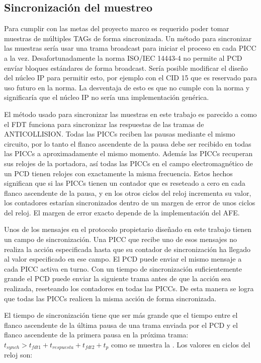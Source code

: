 \documentclass[a4paper, twoside, 11pt]{report}
\begin{document}
\FloatBarrier
\subsection{Sincronización del muestreo}

Para cumplir con las metas del proyecto marco es requerido poder tomar muestras de múltiples TAGs de forma sincronizada. Un método para sincronizar las muestras sería usar una trama broadcast para iniciar el proceso en cada PICC a la vez. Desafortunadamente la norma ISO/IEC 14443-4 no permite al PCD envíar bloques estándares de forma broadcast. Sería posible modificar el diseño del núcleo IP para permitir esto, por ejemplo con el CID 15 que es reservado para uso futuro en la norma. La desventaja de esto es que no cumple con la norma y significaría que el núcleo IP no sería una implementación genérica.

El método usado para sincronizar las muestras en este trabajo es parecido a como el FDT funciona para sincronizar las respuestas de las tramas de ANTICOLLISION. Todas las PICCs reciben las pausas mediante el mismo circuito, por lo tanto el flanco ascendente de la pausa debe ser recibido en todas las PICCs a aproximadamente el mismo momento. Además las PICCs recuperan sus relojes de la portadora, así todas las PICCs en el campo electromagnético de un PCD tienen relojes con exactamente la misma frecuencia. Estos hechos significan que si las PICCs tienen un contador que es reseteado a cero en cada flanco ascendente de la pausa, y en los otros ciclos del reloj incrementa su valor, los contadores estarían sincronizados dentro de un margen de error de unos ciclos del reloj. El margen de error exacto depende de la implementación del AFE.

Unos de los mensajes en el protocolo propietario diseñado en este trabajo tienen un campo de sincronización. Una PICC que recibe uno de esos mensajes no realiza la acción especificada hasta que su contador de sincronización ha llegado al valor especificado en ese campo. El PCD puede enviar el mismo mensaje a cada PICC activa en turno. Con un tiempo de sincronización suficientemente grande el PCD puede enviar la siguiente trama antes de que la acción sea realizada, reseteando los contadores en todas las PICCs. De esta manera se logra que todas las PICCs realicen la misma acción de forma sincronizada.

El tiempo de sincronización tiene que ser más grande que el tiempo entre el flanco ascendente de la última pausa de una trama enviada por el PCD y el flanco ascendente de la primera pausa en la próxima trama: $t_{synch} > t_{fdt1} + t_{respuesta} + t_{fdt2} + t_p$ como se muestra la . Los valores en ciclos del reloj son:
\end{document}
